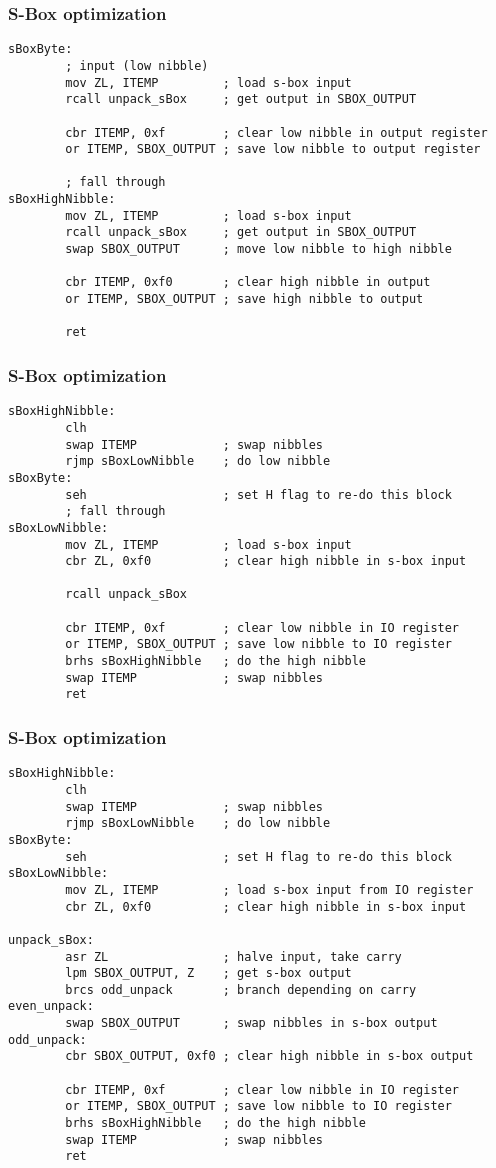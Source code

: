 \documentclass{beamer}
\begin{document}
\begin{frame}[fragile]
\frametitle{S-Box optimization}
\begin{lstlisting}
sBoxByte:
        ; input (low nibble)
        mov ZL, ITEMP         ; load s-box input
        rcall unpack_sBox     ; get output in SBOX_OUTPUT

        cbr ITEMP, 0xf        ; clear low nibble in output register
        or ITEMP, SBOX_OUTPUT ; save low nibble to output register

        ; fall through
sBoxHighNibble:
        mov ZL, ITEMP         ; load s-box input
        rcall unpack_sBox     ; get output in SBOX_OUTPUT
        swap SBOX_OUTPUT      ; move low nibble to high nibble

        cbr ITEMP, 0xf0       ; clear high nibble in output
        or ITEMP, SBOX_OUTPUT ; save high nibble to output

        ret
\end{lstlisting}
\end{frame}

\begin{frame}[fragile]
\frametitle{S-Box optimization}
\begin{lstlisting}
sBoxHighNibble:
        clh
        swap ITEMP            ; swap nibbles
        rjmp sBoxLowNibble    ; do low nibble
sBoxByte:
        seh                   ; set H flag to re-do this block
        ; fall through
sBoxLowNibble:
        mov ZL, ITEMP         ; load s-box input
        cbr ZL, 0xf0          ; clear high nibble in s-box input

        rcall unpack_sBox

        cbr ITEMP, 0xf        ; clear low nibble in IO register
        or ITEMP, SBOX_OUTPUT ; save low nibble to IO register
        brhs sBoxHighNibble   ; do the high nibble
        swap ITEMP            ; swap nibbles
        ret
\end{lstlisting}
\end{frame}

\begin{frame}[fragile]
\frametitle{S-Box optimization}
\begin{lstlisting}
sBoxHighNibble:
        clh
        swap ITEMP            ; swap nibbles
        rjmp sBoxLowNibble    ; do low nibble
sBoxByte:
        seh                   ; set H flag to re-do this block
sBoxLowNibble:
        mov ZL, ITEMP         ; load s-box input from IO register
        cbr ZL, 0xf0          ; clear high nibble in s-box input

unpack_sBox:
        asr ZL                ; halve input, take carry
        lpm SBOX_OUTPUT, Z    ; get s-box output
        brcs odd_unpack       ; branch depending on carry
even_unpack:
        swap SBOX_OUTPUT      ; swap nibbles in s-box output
odd_unpack:
        cbr SBOX_OUTPUT, 0xf0 ; clear high nibble in s-box output

        cbr ITEMP, 0xf        ; clear low nibble in IO register
        or ITEMP, SBOX_OUTPUT ; save low nibble to IO register
        brhs sBoxHighNibble   ; do the high nibble
        swap ITEMP            ; swap nibbles
        ret
\end{lstlisting}
\end{frame}
\end{document}
